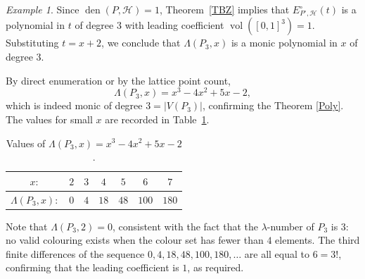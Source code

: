 \documentclass{birkjour}
\theoremstyle{definition}
\theoremstyle{remark}
\newtheorem*{example}{Example}
\numberwithin{equation}{section}
\begin{document}
\begin{example}
Since \( \operatorname{den}(P,\mathcal{H}) = 1 \), Theorem~\ref{TBZ} implies that \( E^{\circ}_{P^{\circ},\mathcal{H}}(t) \)
is a polynomial in \( t \) of degree \( 3 \) with leading coefficient
\( \operatorname{vol}([0,1]^3) = 1 \). Substituting \( t = x+2 \), we
conclude that \( \Lambda(P_3, x) \) is a monic polynomial in \( x \) of
degree \( 3 \).
 
By direct enumeration or by the lattice point count,
\[
\Lambda(P_3, x) = x^3 - 4x^2 + 5x - 2,
\]
which is indeed monic of degree \( 3 = |V(P_3)| \), confirming the Theorem \ref{Poly}.
The values for small \( x \) are recorded in Table~\ref{tab:P3}.
 
\begin{table}[H]
\centering
\caption{Values of \( \Lambda(P_3, x) = x^3 - 4x^2 + 5x - 2 \).}
\label{tab:P3}
\renewcommand{\arraystretch}{1.2}
\begin{tabular}{ccccccc}
\toprule
\( x: \) & \( 2 \) & \( 3 \) & \( 4 \) & \( 5 \) & \( 6 \) & \( 7 \) \\
\midrule
\( \Lambda(P_3,x): \) & \( 0 \) & \( 4 \) & \( 18 \) & \( 48 \) & \( 100 \) & \( 180 \)\\ 
\bottomrule
\end{tabular}
\end{table}
\vskip -2.7cm
Note that \( \Lambda(P_3,2) = 0 \), consistent with the fact that the
\( \lambda \)-number of \( P_3 \) is \( 3 \): no valid colouring exists
when the colour set has fewer than \( 4 \) elements.
The third finite differences of the sequence \( 0, 4, 18, 48, 100, 180,\dots \)
are all equal to \( 6 = 3! \), confirming that the leading coefficient is
\( 1 \), as required.
\end{example}
\end{document}
